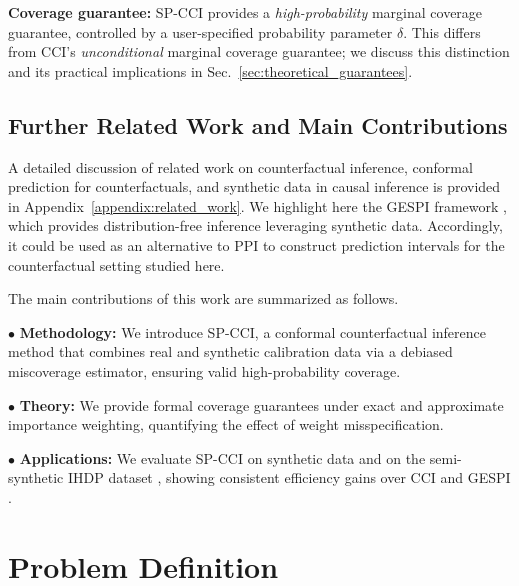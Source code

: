 \documentclass{article}
\theoremstyle{plain}
\theoremstyle{definition}
\theoremstyle{remark}
\begin{document}
\textbf{Coverage guarantee:} SP-CCI provides a \emph{high-probability} marginal coverage guarantee, controlled by a user-specified probability parameter $\delta$. This differs from CCI's \emph{unconditional} marginal coverage guarantee; we discuss this distinction and its practical implications in Sec.~\ref{sec:theoretical_guarantees}.

\subsection{Further Related Work and Main Contributions}
\label{sec:related}

A detailed discussion of related work on counterfactual inference, conformal prediction for counterfactuals, and synthetic data in causal inference is provided in Appendix~\ref{appendix:related_work}. We highlight here the GESPI framework \citep{bashari2026statistical}, which provides distribution-free inference leveraging synthetic data. Accordingly, it could be used as an alternative to PPI to construct prediction intervals for the counterfactual setting studied here.

The main contributions of this work are summarized as follows.

    $\bullet$ \textbf{Methodology:} We introduce SP-CCI, a conformal counterfactual inference method that combines real and synthetic calibration data via a debiased miscoverage estimator, ensuring valid high-probability coverage.

    $\bullet$ \textbf{Theory:} We provide formal coverage guarantees under exact and approximate importance weighting, quantifying the effect of weight misspecification.

    $\bullet$ \textbf{Applications:} We evaluate SP-CCI on synthetic data \citep{lei2021conformal} and on the semi-synthetic IHDP dataset \citep{hill2011bayesian}, showing consistent efficiency gains over CCI \citep{lei2021conformal} and GESPI \citep{bashari2026statistical}.




\section{Problem Definition}
\label{sec:problem_definition}
\end{document}
